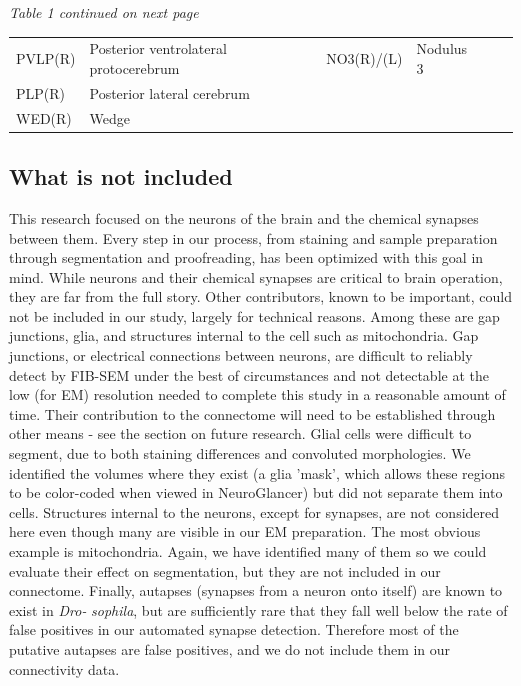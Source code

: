\documentclass{article}
\begin{document}
\noindent\emph{Table 1 continued on next page}
\begin{center}\scriptsize
\begin{longtable}{llllll}
\hspace*{0.8em}PVLP(R) & Posterior ventrolateral protocerebrum & \hspace*{1.6em}NO3(R)/(L) & Nodulus 3 &  &  \\
\hspace*{0.8em}PLP(R) & Posterior lateral cerebrum &  &  &  &  \\
\hspace*{0.8em}WED(R) & Wedge &  &  &  &  \\
\end{longtable}
\end{center}

\subsection*{What is not included}

This research focused on the neurons of the brain and the chemical synapses between them. Every step in our process, from staining and sample preparation through segmentation and proofreading, has been optimized with this goal in mind. While neurons and their chemical synapses are critical to brain operation, they are far from the full story. Other contributors, known to be important, could not be included in our study, largely for technical reasons. Among these are gap junctions, glia, and structures internal to the cell such as mitochondria. Gap junctions, or electrical connections between neurons, are difficult to reliably detect by FIB-SEM under the best of circumstances and not detectable at the low (for EM) resolution needed to complete this study in a reasonable amount of time. Their contribution to the connectome will need to be established through other means - see the section on future research. Glial cells were difficult to segment, due to both staining differences and convoluted morphologies. We identified the volumes where they exist (a glia ’mask’, which allows these regions to be color-coded when viewed in NeuroGlancer) but did not separate them into cells. Structures internal to the neurons, except for synapses, are not considered here even though many are visible in our EM preparation. The most obvious example is mitochondria. Again, we have identified many of them so we could evaluate their effect on segmentation, but they are not included in our connectome. Finally, autapses (synapses from a neuron onto itself) are known to exist in \emph{Dro-} \emph{sophila}, but are sufficiently rare that they fall well below the rate of false positives in our automated synapse detection. Therefore most of the putative autapses are false positives, and we do not include them in our connectivity data.
\end{document}
